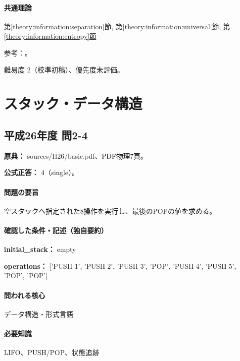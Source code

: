 \paragraph{共通理論} \hyperref[theory:information:separation]{第\ref*{theory:information:separation}節}, \hyperref[theory:information:universal]{第\ref*{theory:information:universal}節}, \hyperref[theory:information:entropy]{第\ref*{theory:information:entropy}節}

\par 参考：\cite{info_separation,info_universal,info_lossless}。

\par 難易度 2（校準初稿）、優先度未評価。

\section{スタック・データ構造}

\subsection{平成26年度 問2-4}
\label{q:h26-reg-basic-2-4}

\noindent\textbf{原典：} sources/H26/basic.pdf、PDF物理7頁。

\textbf{公式正答：} 4（single）。

\paragraph{問題の要旨} 空スタックへ指定された8操作を実行し、最後のPOPの値を求める。

\paragraph{確認した条件・記述（独自要約）}\mbox{}\par

\noindent\textbf{initial\_stack：} empty\par

\noindent\textbf{operations：} ['PUSH 1', 'PUSH 2', 'PUSH 3', 'POP', 'PUSH 4', 'PUSH 5', 'POP', 'POP']\par

\paragraph{問われる核心} データ構造・形式言語

\paragraph{必要知識} LIFO、PUSH/POP、状態追跡

